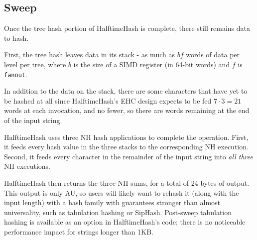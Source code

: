 \documentclass[sigconf, nonacm]{acmart}
\begin{document}
\subsection{Sweep}

Once the tree hash portion of HalftimeHash is complete, there still remains data to hash.

First, the tree hash leaves data in its stack - as much as $bf$ words of data per level per tree, where $b$ is the size of a SIMD register (in 64-bit words) and $f$ is \texttt{fanout}.

In addition to the data on the stack, there are some characters that have yet to be hashed at all since HalftimeHash's EHC design expects to be fed $7 \cdot 3 = 21$ words at each invocation, and no fewer, so there are words remaining at the end of the input string.

HalftimeHash uses three NH hash applications to complete the operation.
First, it feeds every hash value in the three stacks to the corresponding NH execution.
Second, it feeds every character in the remainder of the input string into {\em all three} NH executions.

HalftimeHash then returns the three NH sums, for a total of 24 bytes of output.
This output is only AU, so users will likely want to rehash it (along with the input length) with a hash family with guarantees stronger than almost universality, such as tabulation hashing or SipHash. \cite{tabulation,siphash}
Post-sweep tabulation hashing is available as an option in HalftimeHash's code; there is no noticeable performance impact for strings longer than 1KB.





\end{document}
